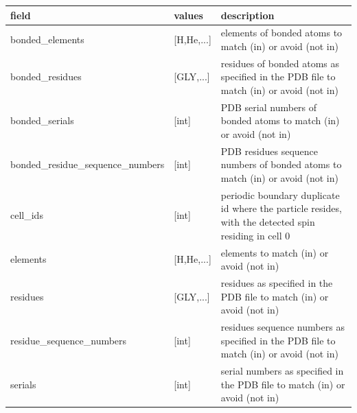 \documentclass{book}
\begin{document}
\begin{center}
\begin{tabular}{| m{20em} | m{1.5cm}| m{7cm} |}
 \hline 
 \textbf{field} & \textbf{values} & \textbf{description} \\ 
 \hline 
 bonded\_elements & [H,He,...] & elements of bonded atoms 
 to match (in) or avoid (not in)\\
 \hline 
 bonded\_residues & [GLY,...] & residues of bonded atoms 
 as specified in the PDB file to match (in) or avoid (not in)\\
 \hline 
 bonded\_serials & [int] & PDB serial numbers of bonded atoms 
 to match (in) or avoid (not in)\\
 \hline 
 bonded\_residue\_sequence\_numbers & [int] & PDB residues sequence numbers 
 of bonded atoms to match (in) or avoid (not in)\\
 \hline 
 cell\_ids & [int] & periodic boundary duplicate id where the particle resides,
 with the detected spin residing in cell 0 
 \\
 \hline 
 elements & [H,He,...] & elements to match (in) or avoid (not in)\\
 \hline 
 residues & [GLY,...] & residues as specified in the PDB file
 to match (in) or avoid (not in)\\
 \hline 
 residue\_sequence\_numbers & [int] & residues sequence numbers 
 as specified in the PDB file to match (in) or avoid (not in)\\
 \hline 
 serials & [int] & serial numbers as specified in the PDB file
 to match (in) or avoid (not in)\\
 \hline 
\end{tabular}
\end{center}  
\end{document}
